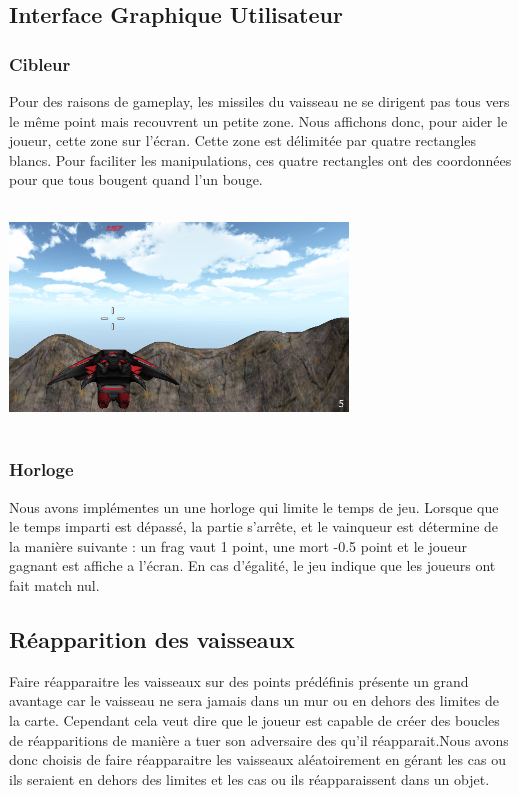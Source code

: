 \documentclass[10pt, titlepage]{report}
\begin{document}
\subsection{Interface Graphique  Utilisateur}

\subsubsection{Cibleur}
 Pour des raisons de gameplay, les missiles du vaisseau ne se dirigent pas tous vers le même point mais recouvrent un petite zone. Nous affichons donc, pour aider le joueur, cette zone sur l'écran. Cette zone est délimitée par quatre rectangles blancs. Pour faciliter les manipulations, ces quatre rectangles ont des coordonnées pour que tous bougent quand l'un bouge. \\

\begin{center}
\includegraphics[height=6cm, width=9cm]{Capture_rebut.PNG}
\end{center}

\subsubsection{Horloge}
Nous avons implémentes un une horloge qui limite le temps de jeu. Lorsque que le temps imparti est dépassé, la partie s'arrête, et le vainqueur est détermine de la manière suivante : un frag vaut 1 point, une mort -0.5 point et le joueur gagnant est affiche a l'écran. En cas d'égalité, le jeu indique que les joueurs ont fait match nul.\\

\subsection{Réapparition des vaisseaux}  
Faire réapparaitre les vaisseaux sur des points prédéfinis présente un grand avantage car le vaisseau ne sera jamais dans un mur ou en dehors des limites de la carte. Cependant cela veut dire que le joueur est capable de créer des boucles de réapparitions de manière a tuer son adversaire des qu'il réapparait.Nous avons donc choisis de faire réapparaitre les vaisseaux aléatoirement en gérant les cas ou ils seraient en dehors des limites et les cas ou ils réapparaissent dans un objet.\\
\end{document}
